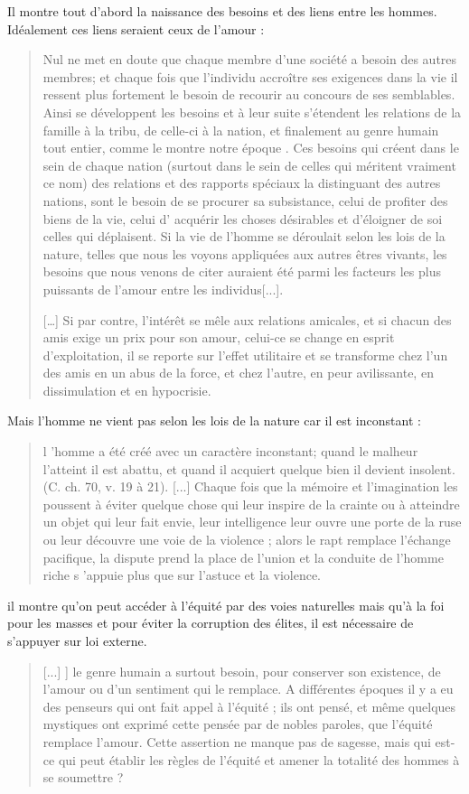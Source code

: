 Il montre tout d'abord la naissance des besoins et des liens entre les hommes. Idéalement ces liens seraient ceux de l'amour : 
\begin{quote}
    Nul ne met en doute que chaque membre d'une société a besoin
des autres membres; et chaque fois que l'individu accroître ses exigences
dans la vie il ressent plus fortement le besoin de recourir au concours
de ses semblables. Ainsi se développent les besoins et à leur suite s'étendent
les relations de la famille à la tribu, de celle-ci à la nation, et finalement
au genre humain tout entier, comme le montre notre époque . Ces
besoins qui créent dans le sein de chaque nation (surtout dans le sein de
celles qui méritent vraiment ce nom) des relations et des rapports
spéciaux la distinguant des autres nations, sont le besoin de se procurer
sa subsistance, celui de profiter des biens de la vie, celui d' acquérir
les choses désirables et d'éloigner de soi celles qui déplaisent. 
Si la vie de l'homme se déroulait selon les lois de la nature, telles
que nous les voyons appliquées aux autres êtres vivants, les besoins
que nous venons de citer auraient été parmi les facteurs les plus puissants
de l'amour entre les individus[...].  

[\ldots]
Si par contre, l'intérêt se mêle aux relations amicales, et si chacun des amis exige un prix pour son amour, celui-ce se change en esprit d'exploitation, il se reporte sur l'effet utilitaire et se transforme chez l'un des amis en un abus de la force, et chez l'autre, en peur avilissante, en dissimulation et en hypocrisie.
\cite[p.66]{Abdou:Rissalat}
\end{quote}
Mais l'homme ne vient pas selon les lois de la nature car il est inconstant : 
\begin{quote}
 l 'homme
a été créé avec un caractère inconstant; quand le malheur l'atteint
il est abattu, et quand il acquiert quelque bien il devient insolent.
(C. ch. 70, v. 19 à 21). [...]
Chaque fois que la mémoire et l'imagination les poussent à
éviter quelque chose qui leur inspire de la crainte ou à atteindre un
objet qui leur fait envie, leur intelligence leur ouvre une porte de la
ruse ou leur découvre une voie de la violence ; alors le rapt remplace
l'échange pacifique, la dispute prend la place de l'union et la conduite
de l'homme riche s 'appuie plus que sur l'astuce et la violence.
\cite[p 68]{Abdou:Rissalat}
\end{quote}
il montre qu'on peut accéder à l'équité par des voies naturelles mais qu'à la foi pour les masses et pour éviter la corruption des élites, il est nécessaire de s'appuyer sur loi externe.
\begin{quote}
[...] ] le genre humain
a surtout besoin, pour conserver son existence, de l'amour ou d'un
sentiment qui le remplace.
A différentes époques il y a eu des penseurs qui ont fait appel à
l'équité ; ils ont pensé, et même quelques mystiques ont exprimé cette
pensée par de nobles paroles, que l'équité remplace l'amour. Cette
assertion ne manque pas de sagesse, mais qui est-ce qui peut établir les
règles de l'équité et amener la totalité des hommes à se soumettre ?
\cite[p 69]{Abdou:Rissalat}
\end{quote}


